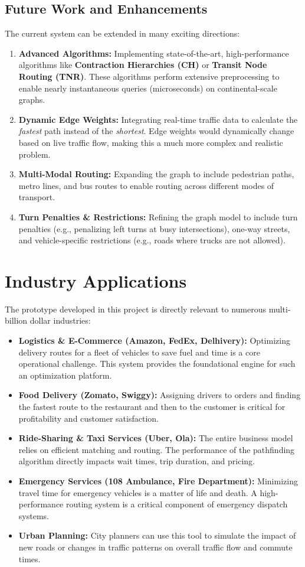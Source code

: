 \documentclass[12pt, a4paper]{report}
\begin{document}
\subsection{Future Work and Enhancements}
The current system can be extended in many exciting directions:
\begin{enumerate}
    \item \textbf{Advanced Algorithms:} Implementing state-of-the-art, high-performance algorithms like \textbf{Contraction Hierarchies (CH)} or \textbf{Transit Node Routing (TNR)}. These algorithms perform extensive preprocessing to enable nearly instantaneous queries (microseconds) on continental-scale graphs.
    \item \textbf{Dynamic Edge Weights:} Integrating real-time traffic data to calculate the \textit{fastest} path instead of the \textit{shortest}. Edge weights would dynamically change based on live traffic flow, making this a much more complex and realistic problem.
    \item \textbf{Multi-Modal Routing:} Expanding the graph to include pedestrian paths, metro lines, and bus routes to enable routing across different modes of transport.
    \item \textbf{Turn Penalties \& Restrictions:} Refining the graph model to include turn penalties (e.g., penalizing left turns at busy intersections), one-way streets, and vehicle-specific restrictions (e.g., roads where trucks are not allowed).
\end{enumerate}

\section{Industry Applications}
The prototype developed in this project is directly relevant to numerous multi-billion dollar industries:
\begin{itemize}
    \item \textbf{Logistics & E-Commerce (Amazon, FedEx, Delhivery):} Optimizing delivery routes for a fleet of vehicles to save fuel and time is a core operational challenge. This system provides the foundational engine for such an optimization platform.
    \item \textbf{Food Delivery (Zomato, Swiggy):} Assigning drivers to orders and finding the fastest route to the restaurant and then to the customer is critical for profitability and customer satisfaction.
    \item \textbf{Ride-Sharing & Taxi Services (Uber, Ola):} The entire business model relies on efficient matching and routing. The performance of the pathfinding algorithm directly impacts wait times, trip duration, and pricing.
    \item \textbf{Emergency Services (108 Ambulance, Fire Department):} Minimizing travel time for emergency vehicles is a matter of life and death. A high-performance routing system is a critical component of emergency dispatch systems.
    \item \textbf{Urban Planning:} City planners can use this tool to simulate the impact of new roads or changes in traffic patterns on overall traffic flow and commute times.
\end{itemize}
\end{document}
